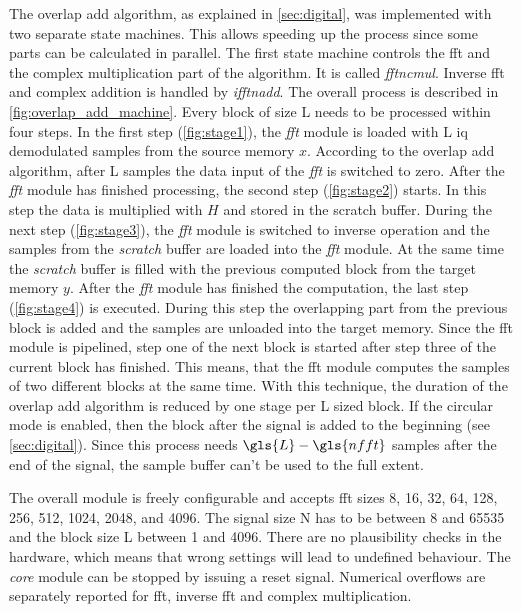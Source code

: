 \documentclass[12pt,a4paper,parskip=full,abstract=true,BCOR=12mm]{scrreprt}
\def\device#1{\mbox{\textit{#1}}}
\begin{document}
The overlap add algorithm, as explained in \cref{sec:digital}, was implemented with
two separate state machines. This allows speeding up the process since some parts can be calculated in parallel.
The first state machine controls the \gls{fft} and the complex multiplication part of the
algorithm. It is called \device{fftncmul}. Inverse \gls{fft} and complex
addition is handled by \device{ifftnadd}. The overall process is described in
\cref{fig:overlap_add_machine}. Every block of size \gls{L}
needs to be processed within four steps. In the first step (\cref{fig:stage1}),
the \device{fft} module is loaded with \gls{L} \gls{iq} demodulated samples from the source memory $x$. According to
the overlap add algorithm, after \gls{L} samples the data input of the \device{fft}
is switched to zero. After the \device{fft} module has finished processing,
the second step (\cref{fig:stage2}) starts. In this step the data is multiplied
with $H$ and stored in the scratch buffer. During the next step (\cref{fig:stage3}),
the \device{fft} module is switched to inverse operation and the samples from the
\device{scratch} buffer are loaded into the \device{fft} module. At the same time
the \device{scratch} buffer is filled with the previous computed block from the target
memory $y$. After the \device{fft} module has finished the computation, the last step (\cref{fig:stage4})
is executed. During this step the overlapping part from the previous block is added and
the samples are unloaded into the target memory. Since the \gls{fft}
module is pipelined, step one of the next block is started after step three
of the current block has finished. This means, that the \gls{fft} module computes
the samples of two different blocks at the same time. With this technique, the
duration of the overlap add algorithm is reduced by one stage per \gls{L} sized block.
If the circular mode is enabled, then the block after the signal is added to the
beginning (see \cref{sec:digital}). Since this process needs $\gls{L} - \gls{nfft}$ samples
after the end of the signal, the sample buffer can't be used to the full extent.

The overall module is freely configurable and accepts \gls{fft} sizes \num{8}, \num{16},
\num{32}, \num{64}, \num{128}, \num{256}, \num{512}, \num{1024}, \num{2048}, and \num{4096}.
The signal size \gls{N} has to be between \num{8} and \num{65535} and the block size
\gls{L} between \num{1} and \num{4096}. There are no plausibility
checks in the hardware, which means that wrong settings will lead to undefined
behaviour. The \device{core} module can be stopped by issuing a reset signal.
Numerical overflows are separately reported for \gls{fft}, inverse \gls{fft}
and complex multiplication.
\end{document}
